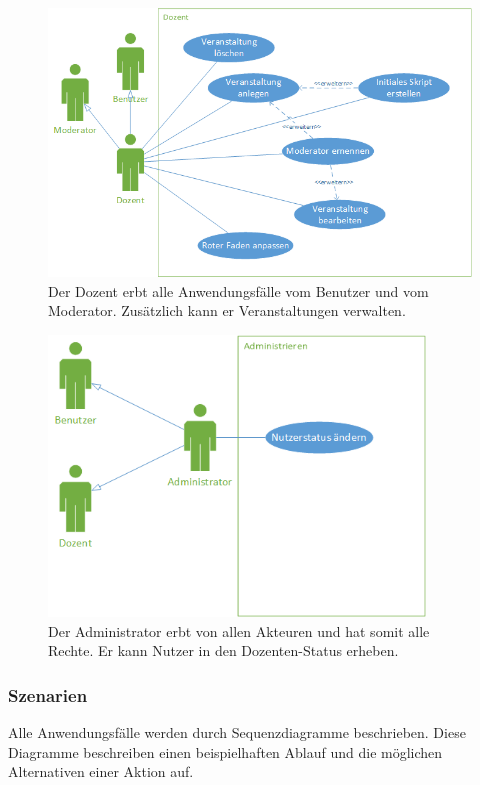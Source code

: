 \documentclass[12pt,a4paper]{article}
\begin{document}
\begin{figure}[H]
	\centering
	\includegraphics[width=\textwidth]{Bilder/Anwendungsfalldiagramme/Dozent.png}
	\caption{Der Dozent erbt alle Anwendungsfälle vom Benutzer und vom Moderator. Zusätzlich kann er Veranstaltungen verwalten.}
	\label{AwfDozent}
\end{figure}

\begin{figure}[H]
	\centering
	\includegraphics[width=10cm]{Bilder/Anwendungsfalldiagramme/Admin.png}
	\caption{Der Administrator erbt von allen Akteuren und hat somit alle Rechte. Er kann Nutzer in den Dozenten-Status erheben.}
	\label{AwfAdmin}
\end{figure}

\newpage

\subsubsection{Szenarien}
Alle Anwendungsfälle werden durch Sequenzdiagramme beschrieben. Diese Diagramme beschreiben einen beispielhaften Ablauf und die möglichen Alternativen einer Aktion auf.
\end{document}

